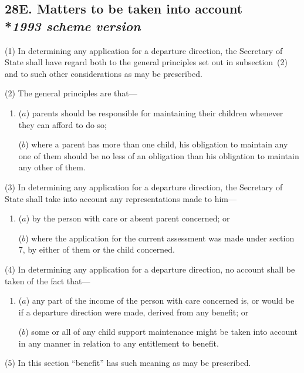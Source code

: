 \documentclass[12pt,a4paper]{article}
\begin{document}
\subsection[28E. Matters to be taken into account --- \emph{1993 scheme version}]{28E. Matters to be taken into account\\*\emph{1993 scheme version}}

(1) In determining any application for a departure direction, the Secretary of State shall have regard both to the general principles set out in subsection~(2) and to such other considerations as may be prescribed.

(2) The general principles are that—
\begin{enumerate}\item[]
($a$) parents should be responsible for maintaining their children whenever they can afford to do so;

($b$) where a parent has more than one child, his obligation to maintain any one of them should be no less of an obligation than his obligation to maintain any other of them.
\end{enumerate}

(3) In determining any application for a departure direction, the Secretary of State shall take into account any representations made to him—
\begin{enumerate}\item[]
($a$) by the person with care or absent parent concerned; or

($b$) where the application for the current assessment was made under section 7, by either of them or the child concerned.
\end{enumerate}

(4) In determining any application for a departure direction, no account shall be taken of the fact that—
\begin{enumerate}\item[]
($a$) any part of the income of the person with care concerned is, or would be if a departure direction were made, derived from any benefit; or

($b$) some or all of any child support maintenance might be taken into account in any manner in relation to any entitlement to benefit.
\end{enumerate}

(5) In this section “benefit” has such meaning as may be prescribed.

\end{document}
